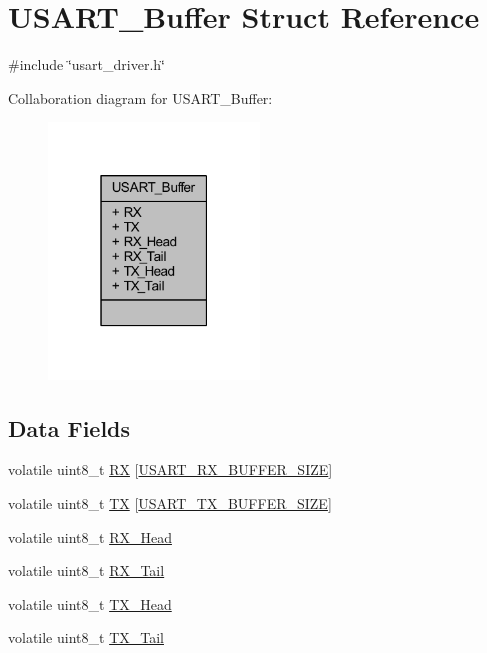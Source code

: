\hypertarget{struct_u_s_a_r_t___buffer}{}\section{U\+S\+A\+R\+T\+\_\+\+Buffer Struct Reference}
\label{struct_u_s_a_r_t___buffer}


{\ttfamily \#include \char`\"{}usart\+\_\+driver.\+h\char`\"{}}



Collaboration diagram for U\+S\+A\+R\+T\+\_\+\+Buffer\+:\nopagebreak
\begin{figure}[H]
\begin{center}
\leavevmode
\includegraphics[width=159pt]{struct_u_s_a_r_t___buffer__coll__graph}
\end{center}
\end{figure}
\subsection*{Data Fields}
\begin{DoxyCompactItemize}
\item 
volatile uint8\+\_\+t \hyperlink{struct_u_s_a_r_t___buffer_a3b83538f34138ed63ae42daeaa092639}{RX} \mbox{[}\hyperlink{usart__driver_8h_ac0999c0821d14cfab43e6f3c778c2b95}{U\+S\+A\+R\+T\+\_\+\+R\+X\+\_\+\+B\+U\+F\+F\+E\+R\+\_\+\+S\+I\+ZE}\mbox{]}
\item 
volatile uint8\+\_\+t \hyperlink{struct_u_s_a_r_t___buffer_a392312bfc5a33886fa4c6999cea21ecc}{TX} \mbox{[}\hyperlink{usart__driver_8h_a21d527450b438bba8dab02e03f021ee3}{U\+S\+A\+R\+T\+\_\+\+T\+X\+\_\+\+B\+U\+F\+F\+E\+R\+\_\+\+S\+I\+ZE}\mbox{]}
\item 
volatile uint8\+\_\+t \hyperlink{struct_u_s_a_r_t___buffer_aca7bb6ebcc2a3f266fac41649a250041}{R\+X\+\_\+\+Head}
\item 
volatile uint8\+\_\+t \hyperlink{struct_u_s_a_r_t___buffer_acbe55e05936cb836303c2fd41ec2d734}{R\+X\+\_\+\+Tail}
\item 
volatile uint8\+\_\+t \hyperlink{struct_u_s_a_r_t___buffer_ae18341a2700d746f90841b29ce8b05ca}{T\+X\+\_\+\+Head}
\item 
volatile uint8\+\_\+t \hyperlink{struct_u_s_a_r_t___buffer_ab4c125e286a5f36c1f44256fd35eb66d}{T\+X\+\_\+\+Tail}
\end{DoxyCompactItemize}


